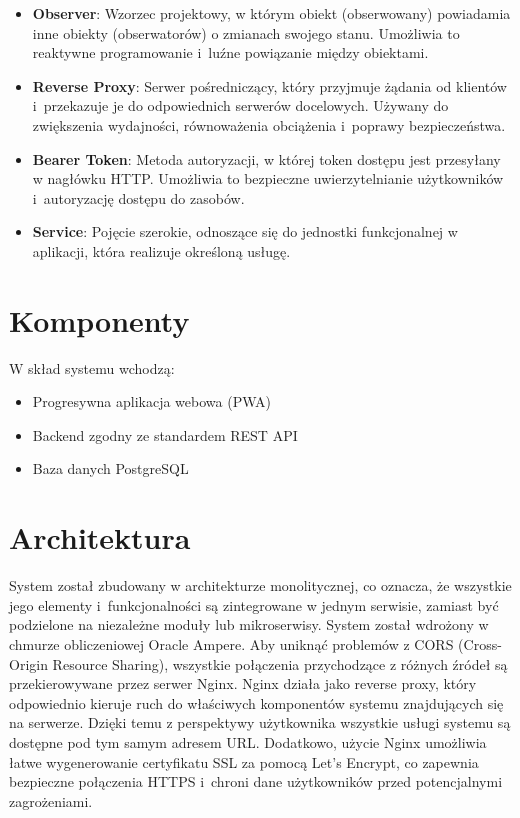 \begin{itemize}
    \item \textbf{Observer}: Wzorzec projektowy, w którym obiekt (obserwowany) powiadamia inne obiekty (obserwatorów) o zmianach swojego stanu.
    Umożliwia to reaktywne programowanie i~luźne powiązanie między obiektami.

    \item \textbf{Reverse Proxy}: Serwer pośredniczący, który przyjmuje żądania od klientów i~przekazuje je do odpowiednich serwerów docelowych.
    Używany do zwiększenia wydajności, równoważenia obciążenia i~poprawy bezpieczeństwa.

    \item \textbf{Bearer Token}: Metoda autoryzacji, w której token dostępu jest przesyłany w nagłówku HTTP\@.
    Umożliwia to bezpieczne uwierzytelnianie użytkowników i~autoryzację dostępu do zasobów.

    \item \textbf{Service}: Pojęcie szerokie, odnoszące się do jednostki funkcjonalnej w aplikacji, która realizuje określoną usługę.

\end{itemize}

\section{Komponenty}\label{sec:komponenty}
W skład systemu wchodzą:
\begin{itemize}
    \item Progresywna aplikacja webowa (PWA)
    \item Backend zgodny ze standardem REST API
    \item Baza danych PostgreSQL
\end{itemize}

\section{Architektura}\label{sec:architektura}
System został zbudowany w architekturze monolitycznej, co oznacza, że wszystkie jego elementy i~funkcjonalności są zintegrowane w jednym serwisie, zamiast być podzielone na niezależne moduły lub mikroserwisy.
System został wdrożony w chmurze obliczeniowej Oracle Ampere.
Aby uniknąć problemów z CORS (Cross-Origin Resource Sharing), wszystkie połączenia przychodzące z różnych źródeł są przekierowywane przez serwer Nginx.
Nginx działa jako reverse proxy, który odpowiednio kieruje ruch do właściwych komponentów systemu znajdujących się na serwerze.
Dzięki temu z perspektywy użytkownika wszystkie usługi systemu są dostępne pod tym samym adresem URL\@.
Dodatkowo, użycie Nginx umożliwia łatwe wygenerowanie certyfikatu SSL za pomocą Let's Encrypt, co zapewnia bezpieczne połączenia HTTPS i~chroni dane użytkowników przed potencjalnymi zagrożeniami.

